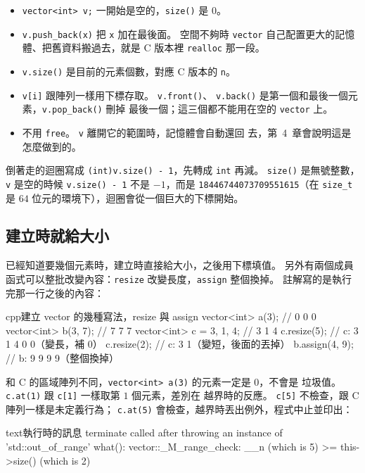 \begin{itemize}
\item \texttt{vector<int> v;} 一開始是空的，\texttt{size()} 是 $0$。
\item \texttt{v.push\_back(x)} 把 \texttt{x} 加在最後面。 空間不夠時
\texttt{vector} 自己配置更大的記憶體、把舊資料搬過去，就是 C 版本裡
\texttt{realloc} 那一段。
\item \texttt{v.size()} 是目前的元素個數，對應 C 版本的 \texttt{n}。
\item \texttt{v[i]} 跟陣列一樣用下標存取。 \texttt{v.front()}、
\texttt{v.back()} 是第一個和最後一個元素，\texttt{v.pop\_back()} 刪掉
最後一個；這三個都不能用在空的 \texttt{vector} 上。
\item 不用 \texttt{free}。 \texttt{v} 離開它的範圍時，記憶體會自動還回
去，第~4~章會說明這是怎麼做到的。
\end{itemize}

倒著走的迴圈寫成 \texttt{(int)v.size() - 1}，先轉成 \texttt{int} 再減。
\texttt{size()} 是無號整數，\texttt{v} 是空的時候 \texttt{v.size() - 1}
不是 $-1$，而是 \texttt{18446744073709551615}（在 \texttt{size\_t} 是
$64$ 位元的環境下），迴圈會從一個巨大的下標開始。

\subsection{建立時就給大小}

已經知道要幾個元素時，建立時直接給大小，之後用下標填值。 另外有兩個成員
函式可以整批改變內容：\texttt{resize} 改變長度，\texttt{assign} 整個換掉。
註解寫的是執行完那一行之後的內容：

\begin{code}{cpp}{建立 vector 的幾種寫法，resize 與 assign}
vector<int> a(3);          // 0 0 0
vector<int> b(3, 7);       // 7 7 7
vector<int> c = {3, 1, 4}; // 3 1 4
c.resize(5);               // c: 3 1 4 0 0（變長，補 0）
c.resize(2);               // c: 3 1（變短，後面的丟掉）
b.assign(4, 9);            // b: 9 9 9 9（整個換掉）
\end{code}

和 C 的區域陣列不同，\texttt{vector<int> a(3)} 的元素一定是 $0$，不會是
垃圾值。 \texttt{c.at(1)} 跟 \texttt{c[1]} 一樣取第 $1$ 個元素，差別在
越界時的反應。 \texttt{c[5]} 不檢查，跟 C 陣列一樣是未定義行為；
\texttt{c.at(5)} 會檢查，越界時丟出例外，程式中止並印出：

\begin{code}{text}{執行時的訊息}
terminate called after throwing an instance of 'std::out_of_range'
  what():  vector::_M_range_check: __n (which is 5) >= this->size() (which is 2)
\end{code}

